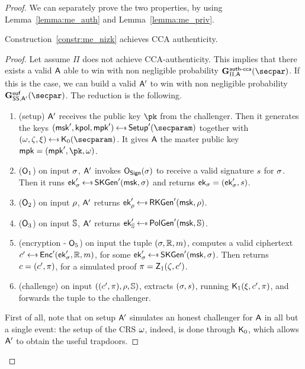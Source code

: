 \begin{proof}
    We can separately prove the two properties, by using Lemma~\ref{lemma:me_auth} and Lemma~\ref{lemma:me_priv}.

    \begin{lemma}\label{lemma:me_auth}
        Construction~\ref{constr:me_nizk} achieves CCA authenticity.
        \begin{proof}
            Let assume $\Pi$ does not achieve CCA-authenticity. This implies that there exists a valid $\mathsf{A}$ able to win with non negligible probability $\NISHeufgamecca{}_{\Pi, \adversary}(\secpar)$. If this is the case, we can build a valid $\mathsf{A}'$ to win with non negligible probability $\Sigeufgame_{\sig, \adversary'}(\secpar)$. The reduction is the following.

            \begin{enumerate}
                \item (setup) $\mathsf{A}'$ receives the public key $\pk$ from the challenger. Then it generates the keys $(\msk', \kpol, \mpk') \getsr \setup'(\secparam)$ together with $(\crs,\tpsim,\tpext)\getsr\nizkext_0(\secparam)$. It gives $\mathsf{A}$ the master public key $\mpk = (\mpk', \pk, \crs)$.
                \item ($\mathsf{O}_1$) on input $\sigma$, $\mathsf{A}'$ invokes $\mathsf{O}_{\mathsf{Sign}}(\sigma)$ to receive a valid signature $s$ for $\sigma$. Then it runs $\ek'_\sattr \getsr \skgen'(\msk, \sattr)$ and returns $\mathsf{ek}_\sigma = (\mathsf{ek}_\sigma', s)$.
                \item ($\mathsf{O}_2$) on input $\rho$, $\mathsf{A}'$ returns $\ek'_\rattr \getsr \rkgen'(\msk, \rattr)$.
                \item ($\mathsf{O}_3$) on input $\mathbb{S}$, $\mathsf{A}'$ returns $\ek'_\saccess \getsr \polgen'(\msk, \saccess)$.
                \item (encryption - $\mathsf{O}_5$) on input the tuple $(\sigma, \mathbb{R}, m)$, computes a valid ciphertext $\cipher' \getsr \enc'(\ek'_\sattr, \raccess, \msg)$, for some $\ek'_\sattr \getsr \skgen'(\msk, \sattr)$. Then returns $c = (c', \pi)$, for a simulated proof $\pi = \mathsf{Z}_1(\zeta, c')$.
                \item (challenge) on input $((c', \pi), \rho, \mathbb{S})$, extracts $(\sigma, s)$, running $\mathsf{K}_1(\xi, c', \pi)$, and forwards the tuple to the challenger.
            \end{enumerate}
            First of all, note that on setup $\mathsf{A}'$ simulates an honest challenger for $\mathsf{A}$ in all but a single event: the setup of the CRS $\omega$, indeed, is done through $\mathsf{K}_0$, which allows $\mathsf{A}'$ to obtain the useful trapdoors.

\end{proof}
\end{lemma}
\end{proof}
